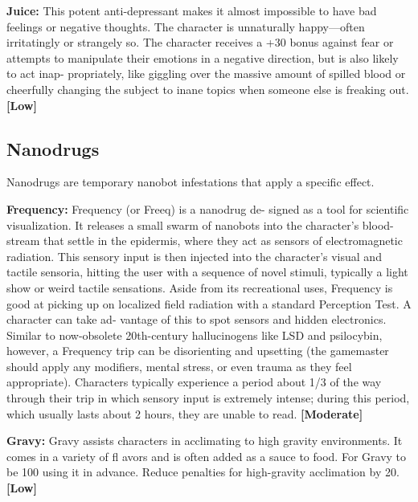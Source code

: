 \textbf{Juice:} This potent anti-depressant makes it almost 
impossible to have bad feelings or negative thoughts. 
The character is unnaturally happy—often irritatingly 
or strangely so. The character receives a +30 bonus 
against fear or attempts to manipulate their emotions 
in a negative direction, but is also likely to act inap-
propriately, like giggling over the massive amount of 
spilled blood or cheerfully changing the subject to 
inane topics when someone else is freaking out. \textbf{[Low]}

\subsection{Nanodrugs}

Nanodrugs are temporary nanobot infestations that 
apply a specific effect.

\textbf{Frequency:} Frequency (or Freeq) is a nanodrug de-
signed as a tool for scientific visualization. It releases 
a small swarm of nanobots into the character's blood-
stream that settle in the epidermis, where they act as 
sensors of electromagnetic radiation. This sensory 
input is then injected into the character's visual and 
tactile sensoria, hitting the user with a sequence of 
novel stimuli, typically a light show or weird tactile 
sensations. Aside from its recreational uses, Frequency 
is good at picking up on localized field radiation with 
a standard Perception Test. A character can take ad-
vantage of this to spot sensors and hidden electronics. 
Similar to now-obsolete 20th-century hallucinogens 
like LSD and psilocybin, however, a Frequency trip 
can be disorienting and upsetting (the gamemaster 
should apply any modifiers, mental stress, or even 
trauma as they feel appropriate). Characters typically 
experience a period about 1/3 of the way through 
their trip in which sensory input is extremely intense; 
during this period, which usually lasts about 2 hours, 
they are unable to read. \textbf{[Moderate]}

\textbf{Gravy:} Gravy assists characters in acclimating to 
high gravity environments. It comes in a variety of 
fl avors and is often added as a sauce to food. For 
Gravy to be 100%
using it in advance. Reduce penalties for high-gravity 
acclimation by 20. \textbf{[Low]}

